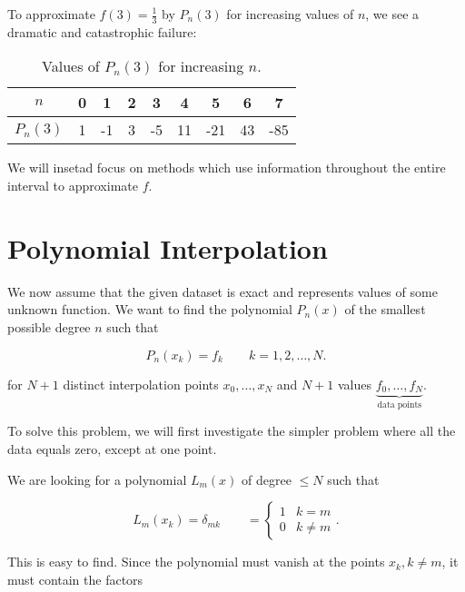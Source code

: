 \documentclass[12pt]{article}
\renewcommand{\arraystretch}{1.25} %
\begin{document}
To approximate $f(3)=\frac{1}{3}$ by $P_n(3)$ for increasing values of $n$, we
see a dramatic and catastrophic failure: 

\begin{table}[h]
    \centering
    \renewcommand{\arraystretch}{1.4}
    \begin{tabular}{|c|c|c|c|c|c|c|c|c|}
        \hline
        \( n \) & 0 & 1 & 2 & 3 & 4 & 5 & 6 & 7 \\ 
        \hline
        \( P_n(3) \) & 1 & -1 & 3 & -5 & 11 & -21 & 43 & -85 \\ 
        \hline
    \end{tabular}
    \caption{Values of \( P_n(3) \) for increasing \( n \).}
\end{table}

We will insetad focus on methods which use information throughout the entire 
interval to approximate $f$.

\section{Polynomial Interpolation}

We now assume that the given dataset is exact and represents values of some
unknown function. We want to find the polynomial $P_n(x)$ of the smallest 
possible degree $n$ such that

\[
P_n(x_k) = f_k \qquad k = 1,2, \dots, N
.\]

for $N+1$ distinct interpolation points $x_0,\dots,x_N$ and $N+1$ values 
$\underbrace{f_0,\dots,f_N}_{\text{data points}}$.

To solve this problem, we will first investigate the simpler problem where all
the data equals zero, except at one point.

We are looking for a polynomial $L_m(x)$ of degree $\leq N$ such that

\[
  L_m(x_k) = \delta_{mk} \qquad = \begin{cases}
    1 & k = m \\
    0 & k \neq m
    \end{cases}
.\]


\begin{center}
\end{center}

This is easy to find. Since the polynomial must vanish at the points 
$x_k, k\neq m$, it must contain the factors
\end{document}
